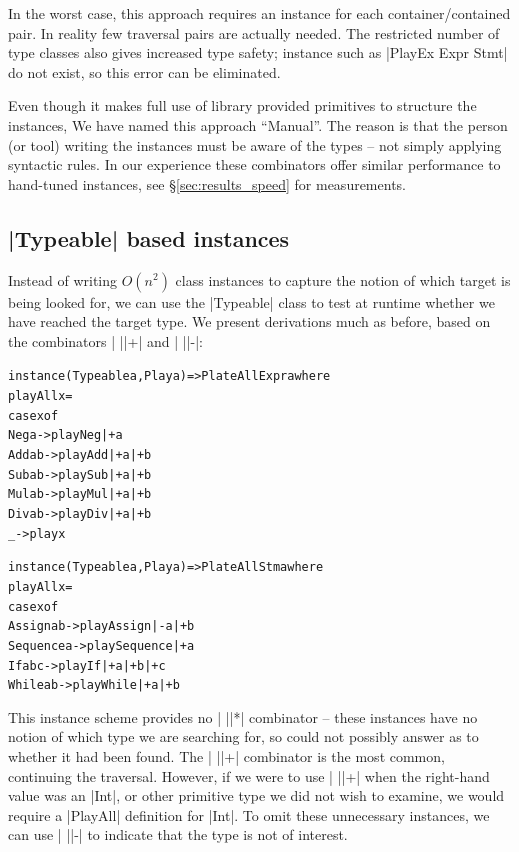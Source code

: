 \documentclass[preprint]{sigplanconf}
\newenvironment{code}{\begin{alltt}\small}{\end{alltt}}
\begin{document}
In the worst case, this approach requires an instance for each container/contained pair. In reality few traversal pairs are actually needed. The restricted number of type classes also gives increased type safety; instance such as |PlayEx Expr Stmt| do not exist, so this error can be eliminated.

Even though it makes full use of library provided primitives to structure the instances, We have named this approach ``Manual''. The reason is that the person (or tool) writing the instances must be aware of the types -- not simply applying syntactic rules. In our experience these combinators offer similar performance to hand-tuned instances, see \S\ref{sec:results_speed} for measurements.


\subsection{|Typeable| based instances}

Instead of writing $O(n^2)$ class instances to capture the notion of which target is being looked for, we can use the |Typeable| class to test at runtime whether we have reached the target type. We present derivations much as before, based on the combinators | ||+| and | ||-|:

\begin{code}
instance (Typeable a, Play a) => PlateAll Expr a where
    playAll x =
        case x of
            Neg a    ->  play Neg  |+ a
            Add a b  ->  play Add  |+ a |+ b
            Sub a b  ->  play Sub  |+ a |+ b
            Mul a b  ->  play Mul  |+ a |+ b
            Div a b  ->  play Div  |+ a |+ b
            _        ->  play x

instance (Typeable a, Play a) => PlateAll Stm a where
    playAll x =
        case x of
            Assign    a b    -> play Assign    |-  a |+ b
            Sequence  a      -> play Sequence  |+  a
            If        a b c  -> play If        |+  a |+ b |+ c
            While     a b    -> play While     |+  a |+ b
\end{code}

This instance scheme provides no | ||*| combinator -- these instances have no notion of which type we are searching for, so could not possibly answer as to whether it had been found. The | ||+| combinator is the most common, continuing the traversal. However, if we were to use | ||+| when the right-hand value was an |Int|, or other primitive type we did not wish to examine, we would require a |PlayAll| definition for |Int|. To omit these unnecessary instances, we can use | ||-| to indicate that the type is not of interest.
\end{document}
